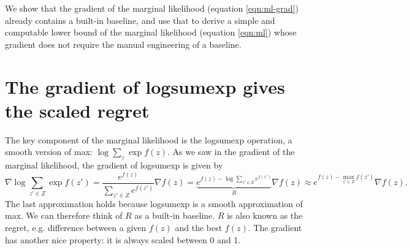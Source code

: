 \documentclass[12pt]{article}
\begin{document}
We show that the gradient of the marginal likelihood (equation \ref{eqn:ml-grad}) already contains
a built-in baseline, and use that to derive a simple and computable lower bound of the marginal likelihood
(equation \ref{eqn:ml}) whose gradient does not require the manual engineering of a baseline.

\section{The gradient of logsumexp gives the scaled regret}
The key component of the marginal likelihood is the logsumexp operation,
a smooth version of max: $\log \sum_z \exp f(z)$.
As we saw in the gradient of the marginal likelihood, the gradient of logsumexp is given by
$$
\nabla \log \sum_{z'\in Z} \exp f(z')
= \frac{e^{f(z)}}{\sum_{z' \in Z} e^{f(z')}} \nabla f(z)
= \underbrace{e^{f(z) - \log \sum_{z' \in Z} e^{f(z')}}}_{R} \nabla f(z)
\approx e^{f(z) - \max_{z' \in Z} f(z')} \nabla f(z).
$$
The last approximation holds because logsumexp is a smooth approximation of max.
We can therefore think of $R$ as a built-in baseline.
$R$ is also known as the regret, e.g. difference between a given $f(z)$
and the best $f(z)$.
The gradient has another nice property: it is always scaled between 0 and 1.
\end{document}
